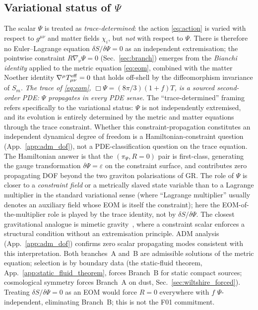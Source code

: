 \documentclass[aps,prd,twocolumn,nofootinbib,floatfix,superscriptaddress]{revtex4-2}
\begin{document}
\subsection{Variational status of $\Psi$}
\label{sec:psi_variational}

The scalar $\Psi$ is treated as \emph{trace-determined}: the action
\eqref{eq:action} is varied with respect to $g^{\mu\nu}$ and matter
fields $\chi_i$, but \emph{not} with respect to $\Psi$. There is
therefore no Euler--Lagrange equation $\delta S/\delta\Psi = 0$ as
an independent extremisation; the pointwise constraint
$R\nabla_\nu\Psi = 0$ (Sec.~\ref{sec:branch}) emerges from the
\emph{Bianchi identity} applied to the metric equation
\eqref{eq:eom}, combined with the matter Noether identity
$\nabla^\mu T^{\rm eff}_{\mu\nu} = 0$ that holds off-shell by the
diffeomorphism invariance of $S_m$. \emph{The trace of
\eqref{eq:eom}, $\Box\Psi = (8\pi/3)(1{+}f)T$, is a sourced
second-order PDE: $\Psi$ propagates in every PDE sense.} The
``trace-determined'' framing refers specifically to the variational
status: $\Psi$ is not independently extremised, and its evolution
is entirely determined by the metric and matter equations through
the trace constraint. Whether this constraint-propagation
constitutes an independent dynamical degree of freedom is a
Hamiltonian-constraint question (App.~\ref{app:adm_dof}), not a
PDE-classification question on the trace equation. The Hamiltonian
answer is that the $(\pi_\Psi, R=0)$ pair is first-class, generating
the gauge transformation $\delta\Psi = \varepsilon$ on the
constraint surface, and contributes zero propagating DOF beyond the
two graviton polarisations of GR. The role of $\Psi$ is closer to a
\emph{constraint field} or a metrically slaved state variable than
to a Lagrange multiplier in the standard variational sense (where
``Lagrange multiplier'' usually denotes an auxiliary field whose
EOM is itself the constraint); here the EOM-of-the-multiplier role
is played by the trace identity, not by $\delta S/\delta\Psi$. The
closest gravitational analogue is mimetic
gravity~\cite{ChamseddineMukhanov2013}, where a constraint scalar
enforces a structural condition without an extremisation principle.
ADM analysis (App.~\ref{app:adm_dof}) confirms zero scalar
propagating modes consistent with this interpretation. Both
branches~A and~B are admissible solutions of the metric equation;
selection is by boundary data (the static-fluid theorem,
App.~\ref{app:static_fluid_theorem}, forces Branch~B for static
compact sources; cosmological symmetry forces Branch~A on dust,
Sec.~\ref{sec:wiltshire_forced}). Treating $\delta S/\delta\Psi = 0$
as an EOM would force $R = 0$ everywhere with $f$ $\Psi$-independent,
eliminating Branch~B; this is not the F01 commitment.
\end{document}
